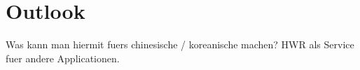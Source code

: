 \chapter{Outlook}
Was kann man hiermit fuers chinesische / koreanische machen?
HWR als Service fuer andere Applicationen.
